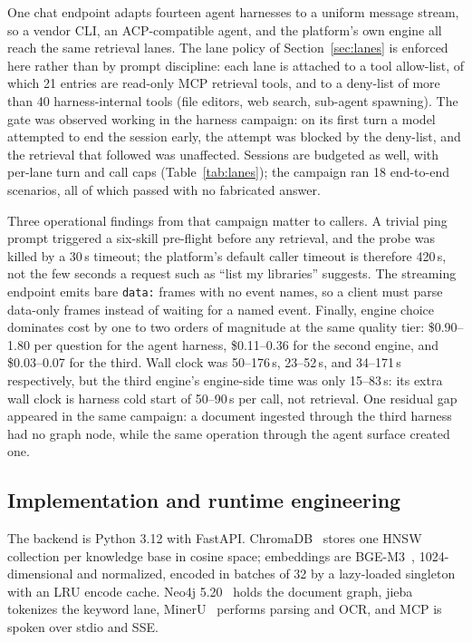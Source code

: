 One chat endpoint adapts fourteen agent harnesses to a uniform message
stream, so a vendor CLI, an ACP-compatible agent, and the platform's own
engine all reach the same retrieval lanes. The lane policy of
Section~\ref{sec:lanes} is enforced here rather than by prompt discipline:
each lane is attached to a tool allow-list, of which 21 entries are
read-only MCP retrieval tools, and to a deny-list of more than 40
harness-internal tools (file editors, web search, sub-agent spawning). The
gate was observed working in the harness campaign: on its first turn a model
attempted to end the session early, the attempt was blocked by the
deny-list, and the retrieval that followed was unaffected. Sessions are
budgeted as well, with per-lane turn and call caps
(Table~\ref{tab:lanes}); the campaign ran 18 end-to-end scenarios, all of
which passed with no fabricated answer.

Three operational findings from that campaign matter to callers. A trivial
ping prompt triggered a six-skill pre-flight before any retrieval, and the
probe was killed by a 30\,s timeout; the platform's default caller timeout
is therefore 420\,s, not the few seconds a request such as ``list my
libraries'' suggests. The streaming endpoint emits bare \texttt{data:}
frames with no event names, so a client must parse data-only frames instead
of waiting for a named event. Finally, engine choice dominates cost by one
to two orders of magnitude at the same quality tier: \$0.90--1.80 per
question for the agent harness, \$0.11--0.36 for the second engine, and
\$0.03--0.07 for the third. Wall clock was 50--176\,s, 23--52\,s, and
34--171\,s respectively, but the third engine's engine-side time was only
15--83\,s: its extra wall clock is harness cold start of 50--90\,s per call,
not retrieval. One residual gap appeared in the same campaign: a document
ingested through the third harness had no graph node, while the same
operation through the agent surface created one.

\subsection{Implementation and runtime engineering}
\label{sec:impl-runtime}

The backend is Python 3.12 with FastAPI. ChromaDB~\cite{chroma} stores one
HNSW~\cite{hnsw} collection per knowledge base in cosine space; embeddings
are BGE-M3~\cite{bge-m3}, 1024-dimensional and normalized, encoded in
batches of 32 by a lazy-loaded singleton with an LRU encode cache. Neo4j
5.20~\cite{neo4j} holds the document graph, jieba~\cite{jieba} tokenizes the
keyword lane, MinerU~\cite{mineru} performs parsing and OCR, and MCP is
spoken over stdio and SSE.

